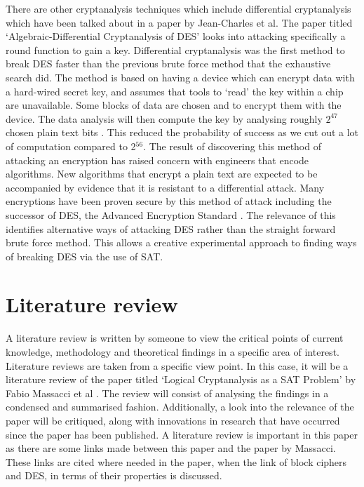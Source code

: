 \documentclass[11pt,a4paper, notitlepage]{report}
\begin{document}
There are other cryptanalysis techniques which include differential cryptanalysis which have been talked about in a paper by Jean-Charles et al. The paper titled `Algebraic-Differential Cryptanalysis of DES' looks into attacking specifically a round function to gain a key. Differential cryptanalysis was the first method to break DES faster than the previous brute force method that the exhaustive search did. The method is based on having a device which can encrypt data with a hard-wired secret key, and assumes that tools to `read' the key within a chip are unavailable. Some blocks of data are chosen and to encrypt them with the device. The data analysis will then compute the key by analysing roughly $2^{47}$ chosen plain text bits \cite{Junod2013LASEC}. This reduced  the probability of success as we cut out a lot of computation compared to 2$^{56}$. The result of discovering this method of attacking an encryption has raised concern with engineers that encode algorithms. New algorithms that encrypt a plain text are expected to be accompanied by evidence that it is resistant to a differential attack. Many encryptions have been proven secure by this method of attack including the successor of DES, the Advanced Encryption Standard \cite{Jean2006Diff}. The relevance of this identifies alternative ways of attacking DES rather than the straight forward brute force method. This allows a creative experimental approach to finding ways of breaking DES via the use of SAT. 






\chapter{Literature review}
\label{cha:LitReview}

A literature review is written by someone to view the critical points of current knowledge, methodology and theoretical findings in a specific area of interest. Literature reviews are taken from a specific view point. In this case, it will be a literature review of the paper titled `Logical Cryptanalysis as a SAT Problem' by Fabio Massacci et al \cite{Fabio2000LogicalSAT}. The review will consist of analysing the findings in a condensed and summarised fashion. Additionally, a look into the relevance of the paper will be critiqued, along with innovations in research that have occurred since the paper has been published. A literature review is important in this paper as there are some links made between this paper and the paper by Massacci. These links are cited where needed in the paper, when the link of block ciphers and DES, in terms of their properties is discussed.  
\end{document}
